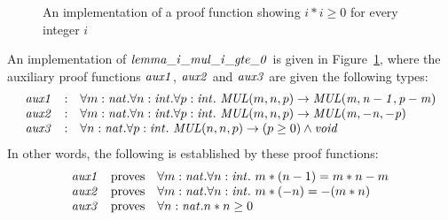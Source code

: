 \begin{figure}[thp]

\caption{An implementation of a proof function showing $i*i\geq 0$ for every integer $i$}
\label{figure:lemma_i_mul_i_gte_0_function}
\end{figure}
An implementation of ${\it lemma\_i\_mul\_i\_gte\_0}$ is given in
Figure~\ref{figure:lemma_i_mul_i_gte_0_function}, where the auxiliary
proof functions ${\it aux1}$, ${\it aux2}$ and ${\it aux3}$ are given
the following types:
\[\begin{array}{rcl}
{\it aux1} & : &
\forall{m:{\it nat}}.\forall{n:{\it int}}.\forall{p:{\it int}}.~{\it MUL}(m,n,p)\rightarrow{\it MUL(m,n-1,p-m)} \\
{\it aux2} & : &
\forall{m:{\it nat}}.\forall{n:{\it int}}.\forall{p:{\it int}}.~{\it MUL}(m,n,p)\rightarrow{\it MUL(m,-n,-p)} \\
{\it aux3} & : &
\forall{n:{\it nat}}.\forall{p:{\it int}}.~{\it MUL}(n,n,p)\rightarrow (p\geq0)\land{\it void} \\
\end{array}\]
In other words, the following is established by these proof functions:
\[\begin{array}{rcl}
{\it aux1} & {\rm proves} & \forall{m:{\it nat}}.\forall{n:{\it int}}.~m*(n-1)=m*n - m \\
{\it aux2} & {\rm proves} & \forall{m:{\it nat}}.\forall{n:{\it int}}.~m*(-n)=-(m*n) \\
{\it aux3} & {\rm proves} & \forall{n:{\it nat}}.n*n\geq 0 \\
\end{array}\]


